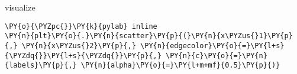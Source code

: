     visualize


{\par%
\vspace{-1\baselineskip}%
}%
\begin{notebookcell}[]%
\begin{addmargin}[\cellleftmargin]{0em}%
{\smaller%
\par%
%
\vspace{-1\smallerfontscale}%
\begin{Verbatim}[commandchars=\\\{\}]
\PY{o}{\PYZpc{}}\PY{k}{pylab} inline
\PY{n}{plt}\PY{o}{.}\PY{n}{scatter}\PY{p}{(}\PY{n}{x\PYZus{}1}\PY{p}{,} \PY{n}{x\PYZus{}2}\PY{p}{,} \PY{n}{edgecolor}\PY{o}{=}\PY{l+s}{\PYZdq{}}\PY{l+s}{\PYZdq{}}\PY{p}{,} \PY{n}{c}\PY{o}{=}\PY{n}{labels}\PY{p}{,} \PY{n}{alpha}\PY{o}{=}\PY{l+m+mf}{0.5}\PY{p}{)}
\end{Verbatim}
%
\par%
\vspace{-1\smallerfontscale}}%
\end{addmargin}
\end{notebookcell}

